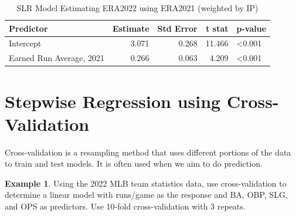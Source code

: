 \documentclass[
  11pt,
]{book}
\theoremstyle{definition}
\theoremstyle{definition}
\newtheorem{example}{Example}[chapter]
\theoremstyle{definition}
\theoremstyle{definition}
\theoremstyle{remark}
\begin{document}
\begin{table}[!h]

\caption{\label{tab:unnamed-chunk-275}SLR Model Estimating ERA2022 using ERA2021 (weighted by IP)}
\centering
\begin{tabular}[t]{lrrrl}
\toprule
Predictor & Estimate & Std Error & t stat & p-value\\
\midrule
Intercept & 3.071 & 0.268 & 11.466 & <0.001\\
Earned Run Average, 2021 & 0.266 & 0.063 & 4.209 & <0.001\\
\bottomrule
\end{tabular}
\end{table}

\newpage

\hypertarget{stepwise-regression-using-cross-validation}{%
\section{Stepwise Regression using Cross-Validation}\label{stepwise-regression-using-cross-validation}}

Cross-validation is a resampling method that uses different portions of the data to train and test models. It is often used when we aim to do prediction.

\begin{example}
Using the 2022 MLB team statistics data, use cross-validation to determine a linear model with runs/game as the response and BA, OBP, SLG, and OPS as predictors. Use 10-fold cross-validation with 3 repeats.
\end{example}
\end{document}
